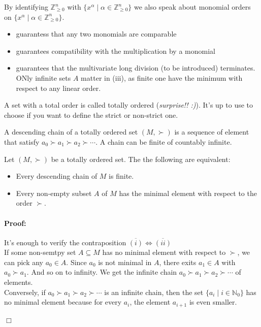 By identifying $\mathbb{Z}^n_{\geq 0}$ with $\{x^{\alpha}\mid \alpha \in \mathbb{Z}^n_{\geq 0}\}$ we also speak about monomial orders on $\{x^{\alpha}\mid \alpha \in \mathbb{Z}^n_{\geq 0}\}$. 

\begin{remark}[title = Remarks]
  \begin{itemize}
    \item[(i)] guarantess that any two monomials are comparable 
    \item[(ii)] guarantees compatibility with the multiplication by a monomial 
    \item[(iii)] guarantees that the multivariate long division (to be introduced) terminates. ONly infinite sets $A$ matter in (iii), as finite one have the minimum with respect to any linear order.  
  \end{itemize}
\end{remark}

\begin{remark}[title = Remark]
  A set with a total order is called totally ordered (\textit{\textcolor{airforceblue}{surprise!! :)}}). It's up to use to choose if you want to define the strict or non-strict one.
\end{remark}

\begin{definition}[title = Definition 2.1.3]
  A descending chain of a totally ordered set $(M, \succ)$ is a sequence of element that satisfy $a_0 \succ a_1 \succ a_2 \succ \cdots$. A chain can be finite of countably infinite.
\end{definition}

\begin{lemma}[title = Lemma 2.1.4]
  Let $(M, \succ)$ be a totally ordered set. The the following are equivalent: 
  \begin{itemize}
    \item[(i)] Every descending chain of $M$ is finite.
    \item[(ii)] Every non-empty subset $A$ of $M$ has the minimal element with respect to the order $\succ$.  
  \end{itemize}

  \paragraph{Proof:} It's enough to verify the contraposition $\overline{(i)} \Leftrightarrow \overline{(ii)}$ \\[0.3em] 
  If some non-semtpy set $A \subseteq M$ has no minimal element with respect to $\succ$, we can pick any $a_0 \in A$. Since $a_0$ is not minimal in $A$, there exits $a_1 \in A$ with $a_0 \succ a_1$. 
  And so on to infinity. We get the infinite chain $a_0 \succ a_1 \succ a_2 \succ \cdots$ of elements. \\[0.3em]
  Conversely, if $a_0 \succ a_1 \succ a_2 \succ \cdots$ is an infinite chain, then the set $\{a_i\mid i \in \mathbb{N}_0\}$ has no minimal element because for every $a_i$, the 
  element $a_{i +1}$ is even smaller. 
    \begin{flushright}
      $\Box $
    \end{flushright}
\end{lemma}

